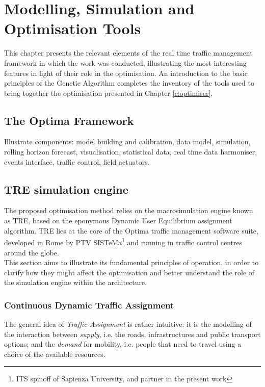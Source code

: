 \chapter{Modelling, Simulation and Optimisation Tools}
This chapter presents the relevant elements of the real time traffic management framework in which the work was conducted, illustrating the most interesting features in light of their role in the optimisation. An introduction to the basic principles of the Genetic Algorithm completes the inventory of the tools used to bring together the optimisation presented in Chapter \ref{c:optimiser}.

\section{The Optima Framework}
Illustrate components: model building and calibration, data model, simulation, rolling horizon forecast, visualisation, statistical data, real time data harmoniser, events interface, traffic control, field actuators.



\section{TRE simulation engine}
The proposed optimisation method relies on the macrosimulation engine known as TRE, based on the eponymous Dynamic User Equilibrium assignment algorithm.
TRE lies at the core of the Optima traffic management software suite, developed in Rome by PTV SISTeMa\footnote{ITS spinoff of Sapienza University, and partner in the present work } and running in traffic control centres around the globe.\\
This section aims to illustrate its fundamental principles of operation, in order to clarify how they might affect the optimisation and better understand the role of the simulation engine within the architecture.

\subsection{Continuous Dynamic Traffic Assignment}
The general idea of \emph{Traffic Assignment} is rather intuitive: it is the modelling of the interaction between \emph{supply}, i.e. the roads, infrastructures and public transport options; and the \emph{demand} for mobility, i.e. people that need to travel using a choice of the available resources.

